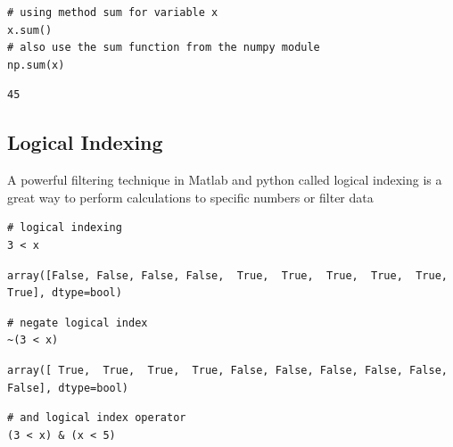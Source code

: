 \documentclass[%
oneside,                 %
final,                   %
10pt]{article}
\begin{document}
\begin{verbatim}
# using method sum for variable x
x.sum()
# also use the sum function from the numpy module
np.sum(x)
\end{verbatim}

\begin{verbatim}
45
\end{verbatim}


\subsection{Logical Indexing}

A powerful filtering technique in Matlab and python called logical indexing is a great way to perform calculations to specific numbers or filter data

\begin{verbatim}
# logical indexing
3 < x
\end{verbatim}

\begin{verbatim}
array([False, False, False, False,  True,  True,  True,  True,  True,  True], dtype=bool)
\end{verbatim}

\begin{verbatim}
# negate logical index
~(3 < x)
\end{verbatim}

\begin{verbatim}
array([ True,  True,  True,  True, False, False, False, False, False, False], dtype=bool)
\end{verbatim}

\begin{verbatim}
# and logical index operator
(3 < x) & (x < 5)
\end{verbatim}
\end{document}

